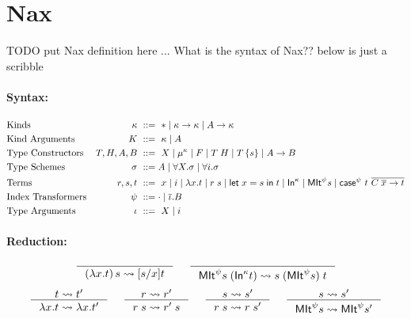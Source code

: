 \section{Nax}
TODO put Nax definition here ...
What is the syntax of Nax?? below is just a scribble

\paragraph{Syntax:}
\begin{align*}
&\text{Kinds}
	& \kappa	&~ ::= ~ * \mid \kappa -> \kappa \mid A -> \kappa
 \\
&\text{Kind Arguments}
	& K		&~ ::= ~ \kappa \mid A
 \\
&\text{Type Constructors}
	& T,H,A,B	&~ ::= ~ X \mid \mu^\kappa \mid F
			   \mid T\;H \mid T\,\{s\}
			   \mid A -> B
 \\
&\text{Type Schemes}
	& \sigma	&~ ::= A
			   \mid \forall X.\sigma
			   \mid \forall i.\sigma
 \\
&\text{Terms}
	& r,s,t		&~ ::= ~ x \mid i
			   \mid \lambda x.t \mid r\;s \mid \mathsf{let}\;x = s\;\mathsf{in}\; t
			   \mid \mathsf{In}^\kappa \mid \mathsf{MIt}^\psi s
			   \mid \mathsf{case}^\psi~t~\overline{C\;\overline{x} -> t}
 \\
&\text{Index Transformers}
	& \psi		&~ ::= \cdot \mid \overline\iota . B
 \\
&\text{Type Arguments}
	& \iota		&~ ::= ~ X \mid i
 \\
\end{align*}

\paragraph{Reduction:}
\[ \inference{}{(\lambda x.t)\,s \rightsquigarrow [s/x]t}
 ~~~~
   \inference{}
             {\MIt^\psi s\;(\In^\kappa t) \rightsquigarrow s\;(\MIt^\psi s)\;t}
\]
\[ \inference{t \rightsquigarrow t'}{\lambda x.t \rightsquigarrow \lambda x.t'}
 ~~~~
   \inference{r \rightsquigarrow r'}{r\;s \rightsquigarrow r'\;s}
 ~~~~
   \inference{s \rightsquigarrow s'}{r\;s \rightsquigarrow r\;s'}
 ~~~~
   \inference{s \rightsquigarrow s'}{\MIt^\psi s \rightsquigarrow \MIt^\psi s'}
\]

